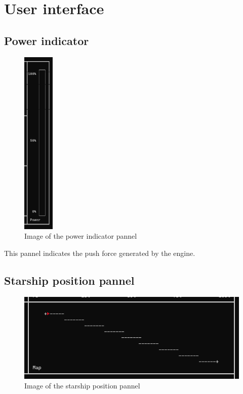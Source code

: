 \documentclass[12pt]{article}
\begin{document}
\newpage
\section{User interface}
\subsection{Power indicator}
\begin{figure}[!htb]
    \center\includegraphics[height=9cm]{images/power_indicator.png}
    \caption{Image of the power indicator pannel}
\end{figure}

This pannel indicates the push force generated by the engine.

\subsection{Starship position pannel}
\begin{figure}[!htb]
    \center\includegraphics[width=\linewidth]{images/ship_positionment.png}
    \caption{Image of the starship position pannel}
\end{figure}
\end{document}
